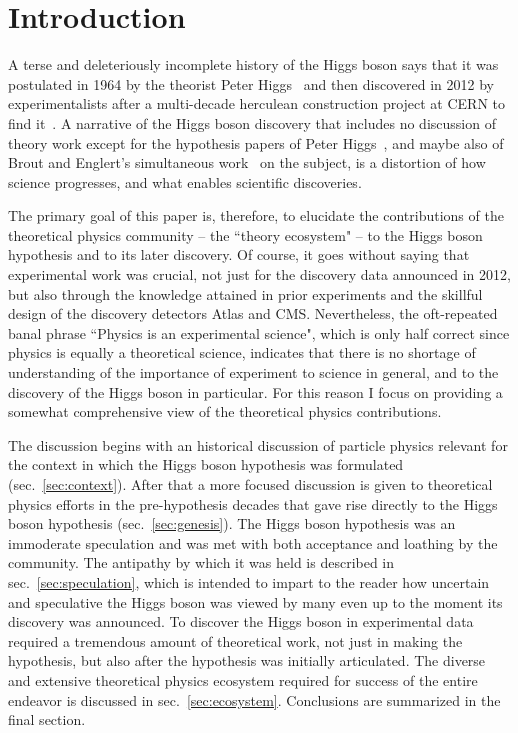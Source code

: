 \documentclass[letter,12pt]{article}
\begin{document}
\vfill\eject
\tableofcontents
\bigskip

\section{Introduction}

A terse and deleteriously incomplete history of the Higgs boson says that it was postulated in 1964 by the theorist Peter Higgs~\cite{Higgs:1964pj} and then discovered in 2012 by experimentalists after a multi-decade herculean construction project at CERN to find it~\cite{Aad:2012tfa,Chatrchyan:2012xdj}. A narrative of the Higgs boson discovery that includes no discussion of theory work except for the hypothesis papers of Peter Higgs~\cite{Higgs:1964pj,Higgs:1964ia}, and maybe also of Brout and Englert's simultaneous work~\cite{Englert:1964et} on the subject, is a distortion of how science progresses, and what enables scientific discoveries.

The primary goal of this paper is, therefore, to elucidate the contributions of the theoretical physics community -- the ``theory ecosystem" -- to the Higgs boson hypothesis and to its later discovery. Of course, it goes without saying that experimental work was crucial, not just for the discovery data announced in 2012, but also through the knowledge attained in prior experiments and the skillful design of the discovery detectors Atlas and CMS. Nevertheless, the oft-repeated banal phrase ``Physics is an experimental science", which is only half correct since physics is equally a theoretical science,  indicates that there is no shortage of understanding of the importance of experiment to science in general, and to the discovery of the Higgs boson in particular. For this reason I focus on providing a somewhat comprehensive view of the theoretical physics contributions.

The discussion begins with an historical discussion of particle physics relevant for the context in which the Higgs boson hypothesis was formulated (sec.~\ref{sec:context}). After that a more focused discussion is given to theoretical physics efforts in the pre-hypothesis decades that gave rise directly to the Higgs boson hypothesis (sec.~\ref{sec:genesis}). The Higgs boson hypothesis was an immoderate speculation and was met with both acceptance and loathing by the community. The antipathy by which it was held is described in sec.~\ref{sec:speculation}, which is intended to impart to the reader  how uncertain and speculative the Higgs boson was viewed by many even up to the moment its discovery was announced. To discover the Higgs boson in experimental data required a tremendous amount of theoretical work, not just in making the hypothesis, but also after the hypothesis was initially articulated. The diverse and extensive theoretical physics ecosystem required for success of the entire endeavor is discussed in sec.~\ref{sec:ecosystem}. Conclusions are summarized in the final section.
\end{document}
